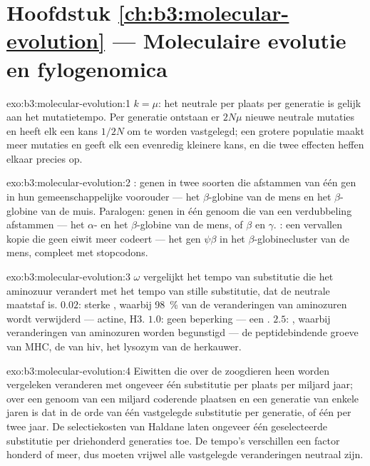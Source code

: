 \section*{Hoofdstuk \ref{ch:b3:molecular-evolution} --- Moleculaire evolutie en fylogenomica}

\begin{solution}{exo:b3:molecular-evolution:1}
$k = \mu$: het neutrale  per plaats per generatie is
gelijk aan het mutatietempo. Per generatie ontstaan er $2N\mu$ nieuwe
neutrale mutaties en heeft elk een kans $1/2N$ om te worden vastgelegd;
een grotere populatie maakt meer mutaties en geeft elk een evenredig
kleinere kans, en die twee effecten heffen elkaar precies op.
\end{solution}

\begin{solution}{exo:b3:molecular-evolution:2}
: genen in twee soorten die afstammen van één gen in hun
gemeenschappelijke voorouder --- het $\beta$-globine van de mens en het
$\beta$-globine van de muis. Paralogen: genen in één genoom die van een verdubbeling
afstammen --- het $\alpha$- en het $\beta$-globine van de mens, of
$\beta$ en $\gamma$. : een vervallen kopie die geen eiwit meer
codeert --- het gen $\psi\beta$ in het $\beta$-globinecluster van de
mens, compleet met stopcodons.
\end{solution}

\begin{solution}{exo:b3:molecular-evolution:3}
$\omega$ vergelijkt het tempo van substitutie die het aminozuur
verandert met het tempo van stille substitutie, dat de neutrale maatstaf
is. $0.02$: sterke , waarbij \qty{98}{\%} van de
veranderingen van aminozuren wordt verwijderd --- actine,  H3.
$1.0$: geen beperking --- een . $2.5$: ,
waarbij veranderingen van aminozuren worden begunstigd --- de
peptidebindende groeve van MHC, de  van hiv, het lysozym van de
herkauwer.
\end{solution}

\begin{solution}{exo:b3:molecular-evolution:4}
Eiwitten die over de zoogdieren heen worden vergeleken veranderen met
ongeveer één substitutie per plaats per miljard jaar; over een genoom
van een miljard coderende plaatsen en een generatie van enkele jaren is
dat in de orde van één vastgelegde substitutie per generatie, of één
per twee jaar. De selectiekosten van Haldane laten ongeveer één
geselecteerde substitutie per driehonderd generaties toe. De tempo's
verschillen een factor honderd of meer, dus moeten vrijwel alle
vastgelegde veranderingen neutraal zijn.
\end{solution}

